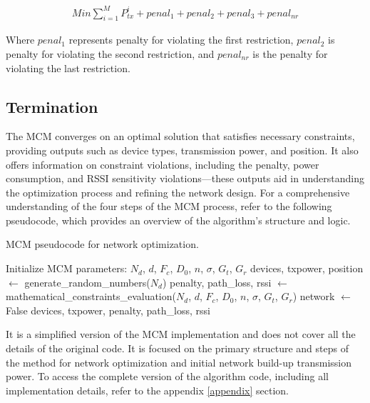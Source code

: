 \begin{equation}\label{eq:objective_function}
    \begin{aligned}
        Min\sum_{i=1}^{M}P_{tx}^i+penal_1+penal_2+penal_3+penal_{nr}
    \end{aligned}
\end{equation}

    Where $penal_1$ represents penalty for violating the first restriction, $penal_2$ is penalty for violating the second restriction, and $penal_{nr}$ is the penalty for violating the last restriction.
\vspace{2mm}

\subsection{Termination}

The \gls{MCM} converges on an optimal solution that satisfies necessary constraints, providing outputs such as device types, transmission power, and position. It also offers information on constraint violations, including the penalty, power consumption, and \gls{RSSI} sensitivity violations—these outputs aid in understanding the optimization process and refining the network design. For a comprehensive understanding of the four steps of the \gls{MCM} process, refer to the following pseudocode, which provides an overview of the algorithm's structure and logic.

\begin{algorithm}[H]
    \caption{\gls{MCM} pseudocode for network optimization.}
    \label{alg:mcm}
    \begin{algorithmic}
    \STATE Initialize \gls{MCM} parameters: $N_d$, $d$, $F_c$, $D_0$, $n$, $\sigma$, $G_t$, $G_r$
        \STATE devices, txpower, position $\gets$ generate\_random\_numbers($N_d$)
        \STATE penalty, path\_loss, rssi $\gets$ mathematical\_constraints\_evaluation($N_d$, $d$, $F_c$, $D_0$, $n$, $\sigma$, $G_t$, $G_r$)
            \STATE network $\gets$ False
        \ENDIF
        \RETURN devices, txpower, penalty, path\_loss, rssi
    \ENDWHILE
    \end{algorithmic}
\end{algorithm}

It is a simplified version of the \gls{MCM} implementation and does not cover all the details of the original code. It is focused on the primary structure and steps of the method for network optimization and initial network build-up transmission power. To access the complete version of the algorithm code, including all implementation details, refer to the appendix \ref{appendix} section.

